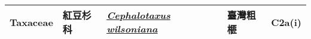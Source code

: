 {\begin{longtable}{L{2.5cm}L{2cm}L{5cm}L{2.5cm}L{3cm}}
    Taxaceae & 紅豆杉科 & \href{http://www.theplantlist.org/tpl1.1/search?q=Cephalotaxus+wilsoniana}{\textit{Cephalotaxus wilsoniana} } & 臺灣粗榧 & C2a(i)    \\
    \bottomrule
        \end{longtable}
        }
    